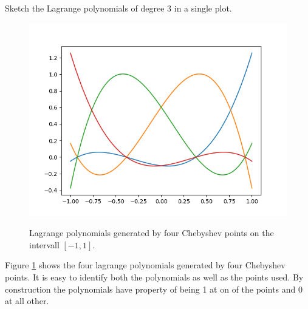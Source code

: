 \begin{problem}
Sketch the Lagrange polynomials of degree 3 in a single plot.
\end{problem}


\begin{solution}  
\begin{figure}[!ht]
  \centering
  \includegraphics[scale = 0.5]{./code/task_3.png}
  \label{fig:task_3}
  \caption{Lagrange polynomials generated by four Chebyshev points on
    the intervall $[-1, 1]$.}
\end{figure}
Figure \ref{fig:task_3} shows the four lagrange polynomials generated
by four Chebyshev points. It is easy to identify both the polynomials
as well as the points used. By construction the polynomials have
property of being 1 at on of the points and 0 at all other.
\end{solution}

